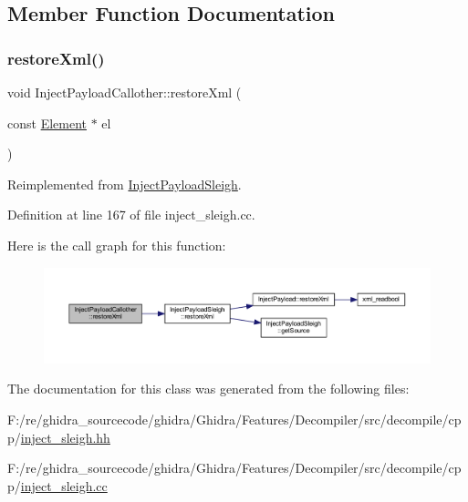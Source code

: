 \subsection{Member Function Documentation}
\mbox{\label{class_inject_payload_callother_a1d09a05eebbf6db00fd72650b45b9b85}} 
\subsubsection{\texorpdfstring{restoreXml()}{restoreXml()}}
{\footnotesize\ttfamily void Inject\+Payload\+Callother\+::restore\+Xml (\begin{DoxyParamCaption}\item[{const \mbox{\hyperlink{class_element}{Element}} $\ast$}]{el }\end{DoxyParamCaption})\hspace{0.3cm}{\ttfamily [virtual]}}



Reimplemented from \mbox{\hyperlink{class_inject_payload_sleigh_ae41de3f330c3cbb5327e94fcf3ae705c}{Inject\+Payload\+Sleigh}}.



Definition at line 167 of file inject\+\_\+sleigh.\+cc.

Here is the call graph for this function\+:
\nopagebreak
\begin{figure}[H]
\begin{center}
\leavevmode
\includegraphics[width=350pt]{class_inject_payload_callother_a1d09a05eebbf6db00fd72650b45b9b85_cgraph}
\end{center}
\end{figure}


The documentation for this class was generated from the following files\+:\begin{DoxyCompactItemize}
\item 
F\+:/re/ghidra\+\_\+sourcecode/ghidra/\+Ghidra/\+Features/\+Decompiler/src/decompile/cpp/\mbox{\hyperlink{inject__sleigh_8hh}{inject\+\_\+sleigh.\+hh}}\item 
F\+:/re/ghidra\+\_\+sourcecode/ghidra/\+Ghidra/\+Features/\+Decompiler/src/decompile/cpp/\mbox{\hyperlink{inject__sleigh_8cc}{inject\+\_\+sleigh.\+cc}}\end{DoxyCompactItemize}
